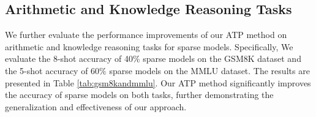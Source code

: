 \subsection{Arithmetic and Knowledge Reasoning Tasks}\label{sec:arithmetic}
We further evaluate the performance improvements of our ATP method on arithmetic and knowledge reasoning tasks for sparse models. Specifically, We evaluate the 8-shot accuracy of 40$\%$ sparse models on the GSM8K dataset and the 5-shot accuracy of 60$\%$ sparse models on the MMLU dataset. The results are presented in Table \ref{tab:gsm8kandmmlu}. Our ATP method significantly improves the accuracy of sparse models on both tasks, further demonstrating the generalization and effectiveness of our approach.
\begin{table}[h!]
    \centering
    \caption{Accuracy of sparse LLaMA2 on the GSM8K and MMLU datasets.}\label{tab:gsm8kandmmlu}
\end{table}

